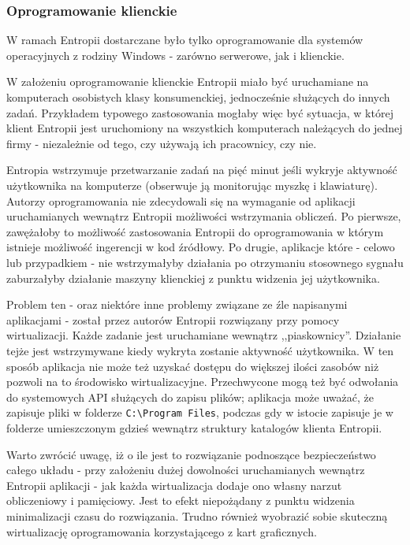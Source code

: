 \documentclass[12pt,a4paper,twoside]{article}
\begin{document}
\subsubsection{Oprogramowanie klienckie}

W ramach Entropii dostarczane było tylko oprogramowanie dla systemów operacyjnych z rodziny Windows - zarówno serwerowe, jak i klienckie.

W założeniu oprogramowanie klienckie Entropii miało być uruchamiane na komputerach osobistych klasy konsumenckiej, jednocześnie służących do innych zadań. Przykładem typowego zastosowania mogłaby więc być sytuacja, w której klient Entropii jest uruchomiony na wszystkich komputerach należących do jednej firmy - niezależnie od tego, czy używają ich pracownicy, czy nie.

Entropia wstrzymuje przetwarzanie zadań na pięć minut jeśli wykryje aktywność użytkownika na komputerze (obserwuje ją monitorując myszkę i klawiaturę). Autorzy oprogramowania nie zdecydowali się na wymaganie od aplikacji uruchamianych wewnątrz Entropii możliwości wstrzymania obliczeń. Po pierwsze, zawężałoby to możliwość zastosowania Entropii do oprogramowania w którym istnieje możliwość ingerencji w kod źródłowy. Po drugie, aplikacje które - celowo lub przypadkiem - nie wstrzymałyby działania po otrzymaniu stosownego sygnału zaburzałyby działanie maszyny klienckiej z punktu widzenia jej użytkownika.

Problem ten - oraz niektóre inne problemy związane ze źle napisanymi aplikacjami - został przez autorów Entropii rozwiązany przy pomocy wirtualizacji. Każde zadanie jest uruchamiane wewnątrz ,,piaskownicy''. Działanie tejże jest wstrzymywane kiedy wykryta zostanie aktywność użytkownika. W ten sposób aplikacja nie może też uzyskać dostępu do większej ilości zasobów niż pozwoli na to środowisko wirtualizacyjne. Przechwycone mogą też być odwołania do systemowych API służących do zapisu plików; aplikacja może uważać, że zapisuje pliki w folderze \texttt{C:\textbackslash{}Program Files}, podczas gdy w istocie zapisuje je w folderze umieszczonym gdzieś wewnątrz struktury katalogów klienta Entropii.

Warto zwrócić uwagę, iż o ile jest to rozwiązanie podnoszące bezpieczeństwo całego układu - przy założeniu dużej dowolności uruchamianych wewnątrz Entropii aplikacji - jak każda wirtualizacja dodaje ono własny narzut obliczeniowy i pamięciowy. Jest to efekt niepożądany z punktu widzenia minimalizacji czasu do rozwiązania. Trudno również wyobrazić sobie skuteczną wirtualizację oprogramowania korzystającego z kart graficznych.
\end{document}
